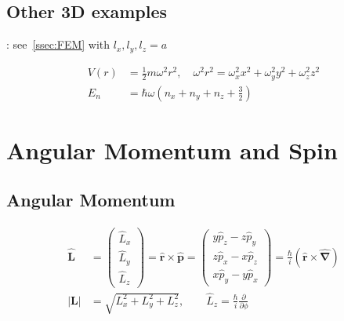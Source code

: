 \subsection{Other 3D examples}
: see~\ref{ssec:FEM} with $l_x,l_y,l_z = a$

\noindent\begin{align*}
    V(r) & = \frac{1}{2}m\omega^2r^2,\quad \omega^2r^2 = \omega_x^2x^2 + \omega_y^2y^2 + \omega_z^2z^2 \\
    E_n  & = \hbar \omega(n_x+n_y+n_z + \frac{3}{2})
\end{align*}

\section{Angular Momentum and Spin}
\subsection{Angular Momentum}
\noindent\begin{align*}
    \widehat{\mathbf{L}} & =
    \begin{pmatrix}
        \widehat{L}_x \\
        \widehat{L}_y \\
        \widehat{L}_z
    \end{pmatrix}
    =\widehat{\mathbf{r}}\times\widehat{\mathbf{p}}
    =
    \begin{pmatrix}
        y\widehat{p}_z-z\widehat{p}_y \\
        z\widehat{p}_x-x\widehat{p}_z \\
        x\widehat{p}_y-y\widehat{p}_x
    \end{pmatrix}
    =\frac{\hbar}{i}(\mathbf{\widehat{r}}\times\widehat{\mathbf{\nabla}})                                                                \\
    |\mathbf{L}|         & =\sqrt{L_{x}^{2}+L_{y}^{2}+L_{z}^{2}},  \qquad \widehat{L}_z = \frac{\hbar}{i} \frac{\partial}{\partial \phi}
\end{align*}

